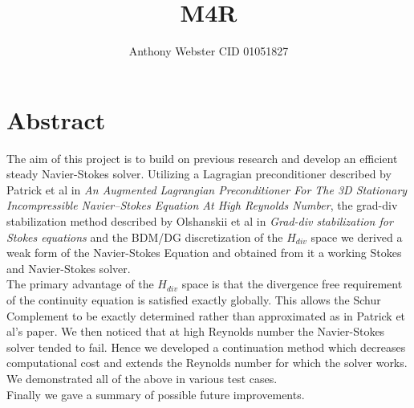 \documentclass[11pt,twoside,a4paper]{article}
\begin{document}
\setcounter{secnumdepth}{4}
\title{M4R}
\author{Anthony Webster CID 01051827}
\maketitle
\clearpage
\section{Abstract}
The aim of this project is to build on previous research and develop an efficient steady Navier-Stokes solver. Utilizing a Lagragian preconditioner described by Patrick et al in \textit{An Augmented Lagrangian Preconditioner For The 3D Stationary Incompressible Navier–Stokes Equation At High Reynolds Number}, the grad-div stabilization method described by Olshanskii et al in \textit{Grad-div stabilization for Stokes equations} and the BDM/DG discretization of the $H_{div}$ space we derived a weak form of the Navier-Stokes Equation and obtained from it a working Stokes and Navier-Stokes solver.\\
The primary advantage of the $H_{div}$ space is that the divergence free requirement of the continuity equation is satisfied exactly globally. This allows the Schur Complement to be exactly determined rather than approximated as in Patrick et al's paper.
We then noticed that at high Reynolds number the Navier-Stokes solver tended to fail. Hence we developed a continuation method which decreases computational cost and extends the Reynolds number for which the solver works.\\
We demonstrated all of the above in various test cases. \\
Finally we gave a summary of possible future improvements.
\clearpage

\tableofcontents
\clearpage
\end{document}
